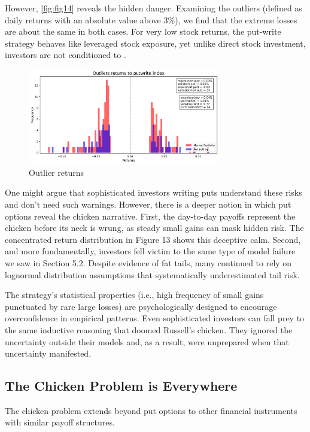 However, \autoref{fig:fig14} reveals the hidden danger. Examining the outliers (defined as daily returns with an absolute value above $3\%$), we find that the extreme losses are about the same in both cases. For very low stock returns, the put-write strategy behaves like leveraged stock exposure, yet unlike direct stock investment, investors are not conditioned to .

\begin{figure}[h]
    \centering
    \includegraphics[width=0.75\textwidth]{fig14.png}
    \caption{Outlier returns}
    \label{fig:fig14}
\end{figure}

One might argue that sophisticated investors writing puts understand these risks and don't need such warnings. However, there is a deeper notion in which put options reveal the chicken narrative. First, the day-to-day payoffs represent the chicken before its neck is wrung, as steady small gains can mask hidden risk. The concentrated return distribution in Figure 13 shows this deceptive calm. Second, and more fundamentally, investors fell victim to the same type of model failure we saw in Section 5.2. Despite evidence of fat tails, many continued to rely on lognormal distribution assumptions that systematically underestimated tail risk.

The strategy's statistical properties (i.e., high frequency of small gains punctuated by rare large losses) are psychologically designed to encourage overconfidence in empirical patterns. Even sophisticated investors can fall prey to the same inductive reasoning that doomed Russell's chicken. They ignored the uncertainty outside their models and, as a result, were unprepared when that uncertainty manifested.


\subsection{The Chicken Problem is Everywhere}
The chicken problem extends beyond put options to other financial instruments with similar payoff structures.

